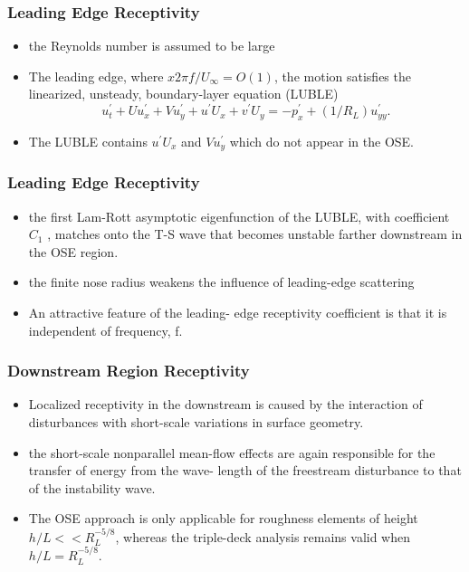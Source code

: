 \documentclass[aspectratio=149]{beamer}
\begin{document}
\begin{frame}
    \frametitle{Leading Edge Receptivity}
    \begin{itemize}
        \item the Reynolds number is assumed to be large
        \item  The leading edge, where $x2 \pi f /U_\infty = O(1)$, the
          motion satisfies the linearized, unsteady, boundary-layer
          equation (LUBLE)
  \begin{equation}
   u_{t}^{\prime}+U u_{x}^{\prime}+V u_{y}^{\prime}+u^{\prime}
   U_{x}+v^{\prime} U_{y}=-p_{x}^{\prime}+\left(1 / R_{L}\right) u_{y
   y}^{\prime}.
    \label{eq:LUBLE}
  \end{equation}
        \item The LUBLE contains $u^{'} U_x$ and $V u^{'}_{y}$ which do not
          appear in the OSE.

    \end{itemize}
\end{frame}

\begin{frame}
    \frametitle{Leading Edge Receptivity}
    \begin{itemize}
        \item the first Lam-Rott asymptotic eigenfunction of the LUBLE,
          with coefficient $C_1$ , matches onto the T-S wave that becomes
          unstable farther downstream in the OSE region.
        \item  the finite nose radius weakens the influence of leading-edge
          scattering
        \item  An attractive feature of the leading- edge receptivity
          coefficient is that it is independent of frequency, f.

    \end{itemize}
\end{frame}

\begin{frame}
    \frametitle{Downstream Region Receptivity}
    \begin{itemize}
        \item Localized receptivity in the downstream is caused by the
          interaction of disturbances with short-scale variations in
          surface geometry.
        \item  the short-scale nonparallel mean-flow effects are again
          responsible for the transfer of energy from the wave- length of
          the freestream disturbance to that of the instability wave.
        \item  The OSE approach is only applicable for roughness elements
          of height $h/L << R^{-5/8}_{L}$, whereas the triple-deck analysis
          remains valid when $h/L = R^{-5/8}_{L}$.

    \end{itemize}
\end{frame}
\end{document}
